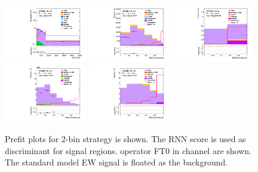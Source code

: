 \begin{figure}[ht]
    \centering
    	\includegraphics[width=0.32\textwidth]{figures/aQGC/Region_distMTagMerJets_DCRVjet_BMin0_J0_incJet1_L2_T0_incFat1_Y6051_incTag1_Fat1_Prefitlog.pdf}
    \includegraphics[width=0.32\textwidth]{figures/aQGC/Region_distRNNScoreMerged_DSRVBSHPLMVV_BMin0_J0_incJet1_L2_T0_incFat1_Y6051_incTag1_Fat1_Prefit.pdf}
 \includegraphics[width=0.32\textwidth]{figures/aQGC/Region_distRNNScoreMerged_DSRVBSHPHMVV_BMin0_J0_incJet1_L2_T0_incFat1_Y6051_incTag1_Fat1_Prefit.pdf}
\includegraphics[width=0.32\textwidth]{figures/aQGC/Region_distRNNScoreMerged_DSRVBSLPLMVV_BMin0_J0_incJet1_L2_T0_incFat1_Y6051_incTag1_Fat1_Prefit.pdf}
    \includegraphics[width=0.32\textwidth]{figures/aQGC/Region_distRNNScoreMerged_DSRVBSLPHMVV_BMin0_J0_incJet1_L2_T0_incFat1_Y6051_incTag1_Fat1_Prefit.pdf}
        \caption{Prefit plots for 2-bin strategy is shown. The RNN score is used as discriminant for signal regions. operator FT0 in \tlep channel are shown. The standard model EW signal is floated as the background.}
        \label{fig:2lepTwoBin}
\end{figure}

